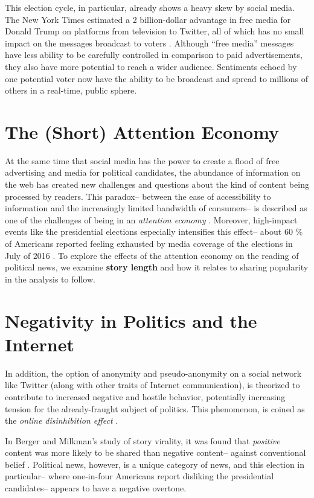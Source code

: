 This election cycle, in particular, already shows a heavy skew by social media. The New York Times estimated a 2 billion-dollar advantage in free media for Donald Trump on platforms from television to Twitter, all of which has no small impact on the messages broadcast to voters \cite{nyt-trump-free-media}. Although ``free media'' messages have less ability to be carefully controlled in comparison to paid advertisements, they also have more potential to reach a wider audience. Sentiments echoed by one potential voter now have the ability to be broadcast and spread to millions of others in a real-time, public sphere.
  
\section{The (Short) Attention Economy}
At the same time that social media has the power to create a flood of free advertising and media for political candidates, the abundance of information on the web has created new challenges and questions about the kind of content being processed by readers. This paradox-- between the ease of accessibility to information and the increasingly limited bandwidth of consumers-- is described as one of the challenges of being in an \emph{attention economy} \cite{goldhaber1997attention}. Moreover, high-impact events like the presidential elections especially intensifies this effect-- about 60 \% of Americans reported feeling exhausted by media coverage of the elections in July of 2016 \cite{election-fatigue}. To explore the effects of the attention economy on the reading of political news, we examine \textbf{story length} and how it relates to sharing popularity in the analysis to follow.


\section{Negativity in Politics and the Internet}
In addition, the option of anonymity and pseudo-anonymity on a social network like Twitter (along with other traits of Internet communication), is theorized to contribute to increased negative and hostile behavior, potentially increasing tension for the already-fraught subject of politics. This phenomenon, is coined as the \emph{online disinhibition effect} \cite{suler2004online}. 

In Berger and Milkman’s study of story virality, it was found that \emph{positive} content was more likely to be shared than negative content-- against conventional belief \cite{berger2012makes}. Political news, however, is a unique category of news, and this election in particular-- where one-in-four Americans report disliking the presidential candidates-- appears to have a negative overtone.

